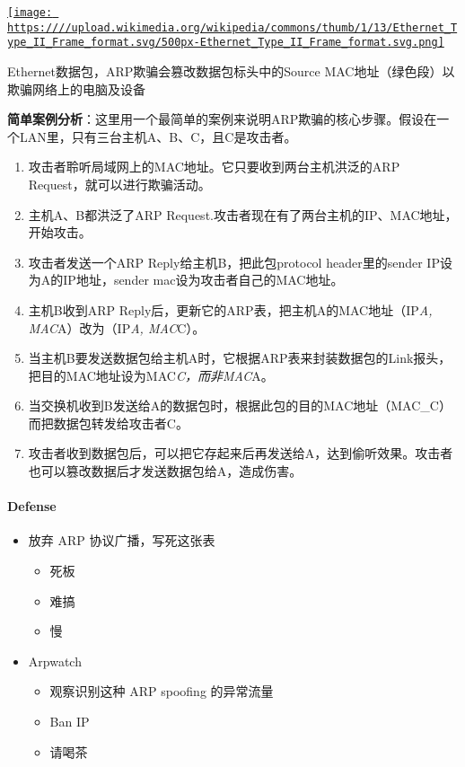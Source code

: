 \documentclass[
]{article}
\begin{document}
\href{https://zh.wikipedia.org/wiki/File:Ethernet_Type_II_Frame_format.svg}{\texttt{[image: https:////upload.wikimedia.org/wikipedia/commons/thumb/1/13/Ethernet\_Type\_II\_Frame\_format.svg/500px-Ethernet\_Type\_II\_Frame\_format.svg.png]}}

Ethernet数据包，ARP欺骗会篡改数据包标头中的Source
MAC地址（绿色段）以欺骗网络上的电脑及设备

\textbf{简单案例分析}：这里用一个最简单的案例来说明ARP欺骗的核心步骤。假设在一个LAN里，只有三台主机A、B、C，且C是攻击者。

\begin{enumerate}
\def\labelenumi{\arabic{enumi}.}
\item
  攻击者聆听局域网上的MAC地址。它只要收到两台主机洪泛的ARP
  Request，就可以进行欺骗活动。
\item
  主机A、B都洪泛了ARP
  Request.攻击者现在有了两台主机的IP、MAC地址，开始攻击。
\item
  攻击者发送一个ARP Reply给主机B，把此包protocol header里的sender
  IP设为A的IP地址，sender mac设为攻击者自己的MAC地址。
\item
  主机B收到ARP Reply后，更新它的ARP表，把主机A的MAC地址（IP\emph{A,
  MAC}A）改为（IP\emph{A, MAC}C）。
\item
  当主机B要发送数据包给主机A时，它根据ARP表来封装数据包的Link报头，把目的MAC地址设为MAC\emph{C，而非MAC}A。
\item
  当交换机收到B发送给A的数据包时，根据此包的目的MAC地址（MAC\_C）而把数据包转发给攻击者C。
\item
  攻击者收到数据包后，可以把它存起来后再发送给A，达到偷听效果。攻击者也可以篡改数据后才发送数据包给A，造成伤害。
\end{enumerate}

\hypertarget{header-n142}{%
\paragraph{Defense}\label{header-n142}}

\begin{itemize}
\item
  放弃 ARP 协议广播，写死这张表

  \begin{itemize}
  \item
    死板
  \item
    难搞
  \item
    慢
  \end{itemize}
\item
  Arpwatch

  \begin{itemize}
  \item
    观察识别这种 ARP spoofing 的异常流量
  \item
    Ban IP
  \item
    请喝茶
  \end{itemize}
\end{itemize}
\end{document}
